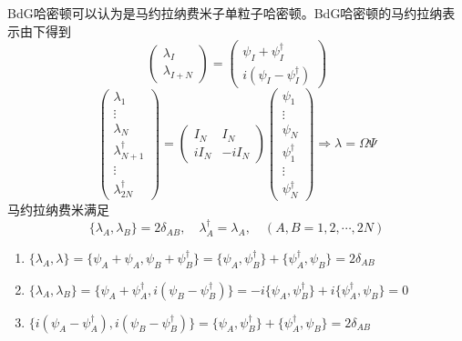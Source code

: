 \documentclass{article}
\numberwithin{equation}{subsection}
\begin{document}
BdG哈密顿可以认为是马约拉纳费米子单粒子哈密顿。BdG哈密顿的马约拉纳表示由下得到
\begin{equation}
    \begin{pmatrix}
        \lambda_I\\
        \lambda_{I+N}
    \end{pmatrix}=\begin{pmatrix}
        \psi_I+\psi_I^\dagger\\
        i(\psi_I-\psi_I^\dagger)
    \end{pmatrix}
\end{equation}
\begin{equation}
    \begin{pmatrix}
        \lambda_1\\
        \vdots\\
        \lambda_N\\
        \lambda_{N+1}^\dagger\\
        \vdots\\
        \lambda_{2N}^\dagger
    \end{pmatrix}=\begin{pmatrix}
        I_N&I_N\\
        iI_N&-iI_N
    \end{pmatrix}\begin{pmatrix}
        \psi_1\\
        \vdots\\
        \psi_N\\
        \psi_1^\dagger\\
        \vdots\\
        \psi_N^\dagger
    \end{pmatrix}\Rightarrow \lambda=\Omega\Psi
\end{equation}
马约拉纳费米满足
\begin{equation}
    \{\lambda_A,\lambda_B\}=2\delta_{AB},\quad\lambda_A^\dagger=\lambda_A,\quad (A,B=1,2,\cdots,2N)
\end{equation}
\begin{enumerate}
    \item $\{\lambda_A,\lambda\}=\{\psi_A+\psi_A,\psi_B+\psi_B^\dagger\}=\{\psi_A,\psi_B^\dagger\}+\{\psi_A^\dagger,\psi_B\}=2\delta_{AB}$
    \item $\{\lambda_A,\lambda_B\}=\{\psi_A+\psi_A^\dagger,i(\psi_B-\psi_B^\dagger)\}=-i\{\psi_A,\psi_B^\dagger\}+i\{\psi_A^\dagger,\psi_B\}=0$
    \item $\{i(\psi_A-\psi_A^\dagger),i(\psi_B-\psi_B^\dagger)\}=\{\psi_A,\psi_B^\dagger\}+\{\psi_A^\dagger,\psi_B\}=2\delta_{AB}$
\end{enumerate}
\end{document}

